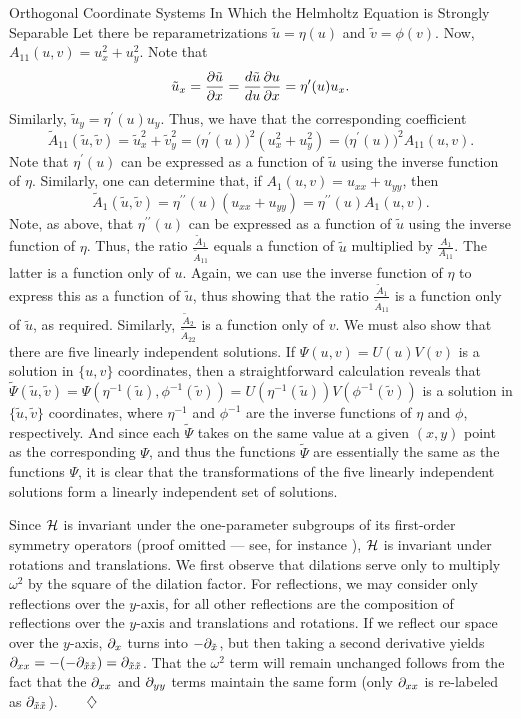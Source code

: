 \begin{section}{Orthogonal Coordinate Systems In Which the Helmholtz Equation is Strongly Separable}
Let there be reparametrizations $\tilde{u} = \eta(u)$ and $\tilde{v} = \phi(v)$.  Now, $A_{11}(u,v) = u_x^2 +u_y^2$.  Note that
\[
\tilde{u}_x = \frac{\partial \tilde{u}}{\partial x} = \frac{d \tilde{u}}{d u} \frac{\partial u}{\partial x} = \eta^\prime(u) u_x.
\]
Similarly, $\tilde{u}_y = \eta^\prime(u) u_y$.  Thus, we have that the corresponding coefficient
\[
\tilde{A}_{11}(\tilde{u},\tilde{v}) = \tilde{u}_x^2 + \tilde{v}_y^2 = \big(\eta^\prime(u)\big)^2 \left( u_x^2 + u_y^2 \right) = \big(\eta^\prime(u)\big)^2 A_{11}(u,v).
\]
Note that $\eta^\prime(u)$ can be expressed as a function of $\tilde{u}$ using the inverse function of $\eta$.  Similarly, one can determine that, if $A_1(u,v) = u_{xx} + u_{yy}$, then
\[
\tilde{A}_1(\tilde{u},\tilde{v}) = \eta^{\prime\prime}(u)(u_{xx} + u_{yy}) = \eta^{\prime\prime}(u)A_1(u,v).
\]
Note, as above, that $\eta^{\prime\prime}(u)$ can be expressed as a function of $\tilde{u}$ using the inverse function of $\eta$.  Thus, the ratio $\frac{\tilde{A}_1}{\tilde{A}_{11}}$ equals a function of $\tilde{u}$ multiplied by $\frac{A_1}{A_{11}}$.  The latter is a function only of $u$.  Again, we can use the inverse function of $\eta$ to express this as a function of $\tilde{u}$, thus showing that the ratio $\frac{\tilde{A}_1}{\tilde{A}_{11}}$ is a function only of $\tilde{u}$, as required.  Similarly, $\frac{\tilde{A}_2}{\tilde{A}_{22}}$ is a function only of $v$.  We must also show that there are five linearly independent solutions.  If $\Psi(u,v) = U(u)V(v)$ is a solution in $\{ u,v \}$ coordinates, then a straightforward calculation reveals that $\widetilde{\Psi}(\tilde{u},\tilde{v}) = \Psi(\eta^{-1}(\tilde{u}),\phi^{-1}(\tilde{v})) = U(\eta^{-1}(\tilde{u}))V(\phi^{-1}(\tilde{v}))$ is a solution in $\{ \tilde{u},\tilde{v} \}$ coordinates, where $\eta^{-1}$ and $\phi^{-1}$ are the inverse functions of $\eta$ and $\phi$, respectively.  And since each $\widetilde{\Psi}$ takes on the same value at a given $(x,y)$ point as the corresponding $\Psi$, and thus the functions $\tilde{\Psi}$ are essentially the same as the functions $\Psi$, it is clear that the transformations of the five linearly independent solutions form a linearly independent set of solutions.

Since $\mathcal{H}$ is invariant under the one-parameter subgroups of its first-order symmetry operators (proof omitted --- see, for instance \cite[pp.~41-43]{spiegel}), $\mathcal{H}$ is invariant under rotations and translations.  We first observe that dilations serve only to multiply $\omega^2$ by the square of the dilation factor.  For reflections, we may consider only reflections over the $y$-axis, for all other reflections are the composition of reflections over the $y$-axis and translations and rotations.  If we reflect our space over the $y$-axis, $\partial_{x}$ turns into $-\partial_{\tilde{x}}$, but then taking a second derivative yields $\partial_{x x} = - (-\partial_{\tilde{x} \tilde{x}}) = \partial_{\tilde{x} \tilde{x}}$.  That the $\omega^2$ term will remain unchanged follows from the fact that the $\partial_{x x}$ and $\partial_{y y}$ terms maintain the same form (only $\partial_{x x}$ is re-labeled as $\partial_{\tilde{x} \tilde{x}}$).$\qquad \diamondsuit$


\end{section}
